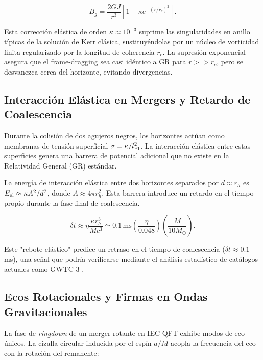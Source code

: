\documentclass[11pt,a4paper]{article}
\begin{document}
\begin{equation}
	B_g = \frac{2 G J}{r^3} \left[ 1 - \kappa e^{-(r/r_c)^2} \right].
\end{equation}

Esta corrección elástica de orden \( \kappa \approx 10^{-3} \) suprime las singularidades en anillo típicas de la solución de Kerr clásica, sustituyéndolas por un núcleo de vorticidad finita regularizado por la longitud de coherencia \( r_c \). La supresión exponencial asegura que el frame-dragging sea casi idéntico a GR para $r >> r_c$, pero se desvanezca cerca del horizonte, evitando divergencias.

\subsection{Interacción Elástica en Mergers y Retardo de Coalescencia}

Durante la colisión de dos agujeros negros, los horizontes actúan como membranas de tensión superficial \( \sigma = \kappa / l_{\rm Pl}^2 \). La interacción elástica entre estas superficies genera una barrera de potencial adicional que no existe en la Relatividad General (GR) estándar. 

La energía de interacción elástica entre dos horizontes separados por \( d \approx r_h \) es \( E_{\rm el} \approx \kappa A^2 / d^2 \), donde \( A \approx 4\pi r_h^2 \). Esta barrera introduce un retardo en el tiempo propio durante la fase final de coalescencia.

\begin{equation}
	\boxed{ \delta t \approx \eta \frac{\kappa r_h^3}{M c^3} \simeq 0.1 \, \text{ms} \left( \frac{\eta}{0.048} \right) \left( \frac{M}{10 M_\odot} \right) }.
\end{equation}

Este "rebote elástico" predice un retraso en el tiempo de coalescencia ($\delta t \approx 0.1$ ms), una señal que podría verificarse mediante el análisis estadístico de catálogos actuales como GWTC-3 \cite{LIGO_GWTC3}.

\subsection{Ecos Rotacionales y Firmas en Ondas Gravitacionales}

La fase de \textit{ringdown} de un merger rotante en IEC-QFT exhibe modos de eco únicos. La cizalla circular inducida por el espín \( a/M \) acopla la frecuencia del eco con la rotación del remanente:
\end{document}
